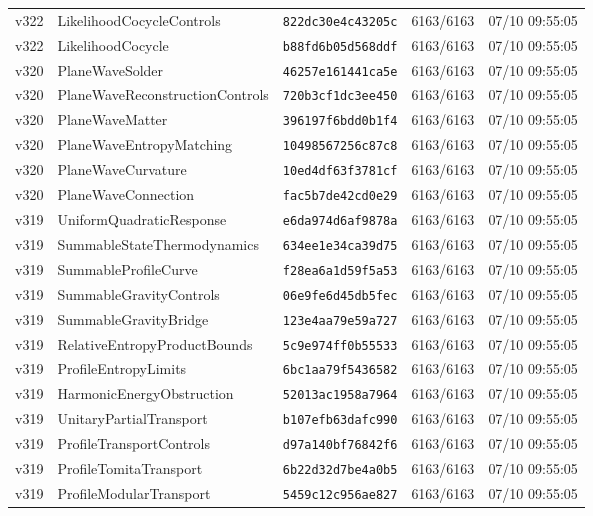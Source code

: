 \documentclass[11pt]{article}
\theoremstyle{definition}\newtheorem{deriv}{Derivação}
\begin{document}
{\begin{longtable}{@{}lllll@{}}
v322 & LikelihoodCocycleControls & \texttt{822dc30e4c43205c} & 6163/6163 & 07/10 09:55:05 \\
v322 & LikelihoodCocycle & \texttt{b88fd6b05d568ddf} & 6163/6163 & 07/10 09:55:05 \\
v320 & PlaneWaveSolder & \texttt{46257e161441ca5e} & 6163/6163 & 07/10 09:55:05 \\
v320 & PlaneWaveReconstructionControls & \texttt{720b3cf1dc3ee450} & 6163/6163 & 07/10 09:55:05 \\
v320 & PlaneWaveMatter & \texttt{396197f6bdd0b1f4} & 6163/6163 & 07/10 09:55:05 \\
v320 & PlaneWaveEntropyMatching & \texttt{10498567256c87c8} & 6163/6163 & 07/10 09:55:05 \\
v320 & PlaneWaveCurvature & \texttt{10ed4df63f3781cf} & 6163/6163 & 07/10 09:55:05 \\
v320 & PlaneWaveConnection & \texttt{fac5b7de42cd0e29} & 6163/6163 & 07/10 09:55:05 \\
v319 & UniformQuadraticResponse & \texttt{e6da974d6af9878a} & 6163/6163 & 07/10 09:55:05 \\
v319 & SummableStateThermodynamics & \texttt{634ee1e34ca39d75} & 6163/6163 & 07/10 09:55:05 \\
v319 & SummableProfileCurve & \texttt{f28ea6a1d59f5a53} & 6163/6163 & 07/10 09:55:05 \\
v319 & SummableGravityControls & \texttt{06e9fe6d45db5fec} & 6163/6163 & 07/10 09:55:05 \\
v319 & SummableGravityBridge & \texttt{123e4aa79e59a727} & 6163/6163 & 07/10 09:55:05 \\
v319 & RelativeEntropyProductBounds & \texttt{5c9e974ff0b55533} & 6163/6163 & 07/10 09:55:05 \\
v319 & ProfileEntropyLimits & \texttt{6bc1aa79f5436582} & 6163/6163 & 07/10 09:55:05 \\
v319 & HarmonicEnergyObstruction & \texttt{52013ac1958a7964} & 6163/6163 & 07/10 09:55:05 \\
v319 & UnitaryPartialTransport & \texttt{b107efb63dafc990} & 6163/6163 & 07/10 09:55:05 \\
v319 & ProfileTransportControls & \texttt{d97a140bf76842f6} & 6163/6163 & 07/10 09:55:05 \\
v319 & ProfileTomitaTransport & \texttt{6b22d32d7be4a0b5} & 6163/6163 & 07/10 09:55:05 \\
v319 & ProfileModularTransport & \texttt{5459c12c956ae827} & 6163/6163 & 07/10 09:55:05 \\

\end{longtable}}
\end{document}
